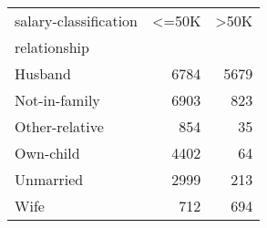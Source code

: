 \begin{tabular}{lrr}
\toprule
salary-classification &   <=50K &   >50K \\
relationship    &         &        \\
\midrule
 Husband        &    6784 &   5679 \\
 Not-in-family  &    6903 &    823 \\
 Other-relative &     854 &     35 \\
 Own-child      &    4402 &     64 \\
 Unmarried      &    2999 &    213 \\
 Wife           &     712 &    694 \\
\bottomrule
\end{tabular}
